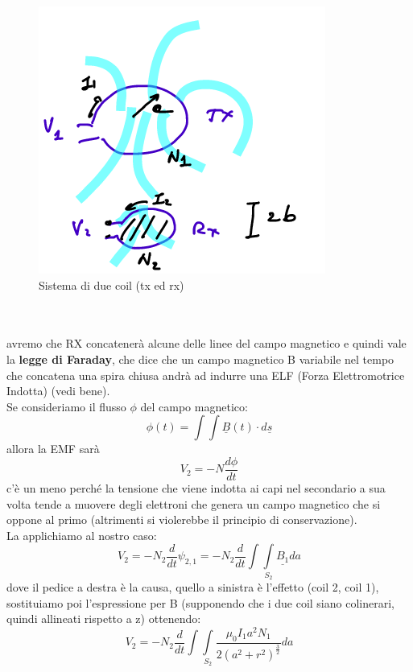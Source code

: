 \documentclass[oneside, 12pt]{extbook}
\begin{document}
\begin{figure}
	\includegraphics[scale=0.6]{immagini/coils.png}
	\caption{Sistema di due coil (tx ed rx)}
\end{figure}
\\\\avremo che RX concatenerà alcune delle linee del campo magnetico e quindi vale la \textbf{legge di Faraday}, che dice che un campo magnetico B variabile nel tempo che concatena una spira chiusa andrà ad indurre una ELF (Forza Elettromotrice Indotta) (vedi bene).\\Se consideriamo il flusso $\phi$ del campo magnetico:
\begin{equation}
	\phi(t) = \int\int \underline{B}(t) \cdot d\underline{s}
\end{equation}
allora la EMF sarà 
\begin{equation}
	V_2 = -N\frac{d\phi}{dt}
\end{equation}
c'è un meno perché la tensione che viene indotta ai capi nel secondario a sua volta tende a muovere degli elettroni che genera un campo magnetico che si oppone al primo (altrimenti si violerebbe il principio di conservazione).\\La applichiamo al nostro caso:
\begin{equation}
	V_2 = -N_2 \frac{d}{dt} \psi_{2,1} = -N_2 \frac{d}{dt} \int\int\limits_{S_2} \underline{B_1} da
\end{equation}
dove il pedice a destra è la causa, quello a sinistra è l'effetto (coil 2, coil 1), sostituiamo poi l'espressione per B (supponendo che i due coil siano colinerari, quindi allineati rispetto a z) ottenendo:
\begin{equation}
	V_2 = -N_2 \frac{d}{dt} \int\int\limits_{S_2} \frac{\mu_0 I_1 a^2 N_1}{2(a^2 + r^2)^{\frac{3}{2}}} da
\end{equation}
\end{document}
